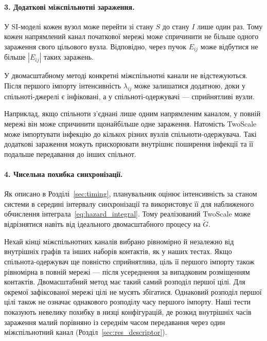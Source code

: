 \documentclass[a4paper,fleqn]{cas-sc}
\begin{document}
\paragraph{3. Додаткові міжспільнотні зараження.}
У SI-моделі кожен вузол може перейти зі стану $S$ до стану $I$ лише один раз. Тому кожен напрямлений канал початкової мережі може спричинити не більше одного зараження свого цільового вузла. Відповідно, через пучок $E_{ij}$ може відбутися не більше $|E_{ij}|$ таких заражень.

У двомасштабному методі конкретні міжспільнотні канали не відстежуються. Після першого імпорту інтенсивність $\lambda_{ij}$ може залишатися додатною, доки у спільноті-джерелі є інфіковані, а у спільноті-одержувачі --- сприйнятливі вузли.

Наприклад, якщо спільноти з'єднані лише одним напрямленим каналом, у повній мережі він може спричинити щонайбільше одне зараження. Натомість TwoScale може імпортувати інфекцію до кількох різних вузлів спільноти-одержувача. Такі додаткові зараження можуть прискорювати внутрішнє поширення інфекції та її подальше передавання до інших спільнот.



\paragraph{4. Чисельна похибка синхронізації.}
Як описано в Розділі~\ref{sec:timing}, планувальник оцінює інтенсивність за станом системи в середині інтервалу синхронізації та використовує її для наближеного обчислення інтеграла~\eqref{eq:hazard_integral}. Тому реалізований TwoScale може відрізнятися навіть від ідеального двомасштабного процесу на $\tilde G$.


\begin{remark}
\label{rem:placement}
Нехай кінці міжспільнотних каналів вибрано рівномірно й незалежно від внутрішніх графів та інших наборів контактів, як у наших тестах. Якщо спільнота-одержувач ще повністю сприйнятлива, ціль її першого імпорту також рівномірна в повній мережі --- після усереднення за випадковим розміщенням контактів. Двомасштабний метод має такий самий розподіл першої цілі. Для окремої зафіксованої мережі цілі не мусять збігатися. Однаковий розподіл першої цілі також не означає однакового розподілу часу першого імпорту. Наші тести показують невелику похибку в низці конфігурацій, де розкид внутрішніх часів зараження малий порівняно
із середнім часом передавання через один міжспільнотний
канал (Розділ~\ref*{sec:res_descriptor}).
\end{remark}
\end{document}
